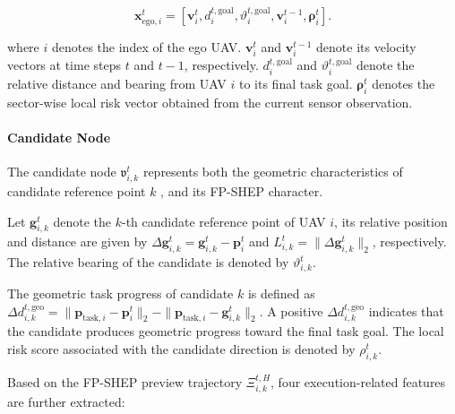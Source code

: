 \begin{equation}
    \label{eq:ego_node}
    \mathbf{x}_{\mathrm{ego},i}^{t}
    =
    \left[
        \mathbf{v}_{i}^{t},
        d_{i}^{t,\mathrm{goal}},
        \vartheta_{i}^{t,\mathrm{goal}},
        \mathbf{v}_{i}^{t-1},
        \boldsymbol{\rho}_{i}^{t}
    \right].
\end{equation}

\noindent
where $i$ denotes the index of the ego UAV. $\mathbf{v}_{i}^{t}$ and $\mathbf{v}_{i}^{t-1}$ denote its velocity vectors at time steps $t$ and $t-1$, respectively. $d_{i}^{t,\mathrm{goal}}$ and $\vartheta_{i}^{t,\mathrm{goal}}$ denote the relative distance and bearing from UAV $i$ to its final task goal. $\boldsymbol{\rho}_{i}^{t}$ denotes the sector-wise local risk vector obtained from the current sensor observation.

\paragraph{Candidate Node}
The candidate node $\mathfrak{v}_{i,k}^{t}$ represents both the geometric characteristics of candidate reference point $k$ , and its FP-SHEP character.

Let $\mathbf{g}_{i,k}^{t}$ denote the $k$-th candidate reference point of UAV $i$, its relative position and distance are given by $\Delta\mathbf{g}_{i,k}^{t}=\mathbf{g}_{i,k}^{t}-\mathbf{p}_{i}^{t}$ and $L_{i,k}^{t}=\|\Delta\mathbf{g}_{i,k}^{t}\|_{2}$, respectively. The relative bearing of the candidate is denoted by $\vartheta_{i,k}^{t}$.

The geometric task progress of candidate $k$ is defined as $\Delta d_{i,k}^{t,\mathrm{geo}}=\|\mathbf{p}_{\mathrm{task},i}-\mathbf{p}_{i}^{t}\|_{2}-\|\mathbf{p}_{\mathrm{task},i}-\mathbf{g}_{i,k}^{t}\|_{2}$. A positive $\Delta d_{i,k}^{t,\mathrm{geo}}$ indicates that the candidate produces geometric progress toward the final task goal. The local risk score associated with the candidate direction is denoted by $\rho_{i,k}^{t}$.

Based on the FP-SHEP preview trajectory $\Xi_{i,k}^{t,H}$, four execution-related features are further extracted:

